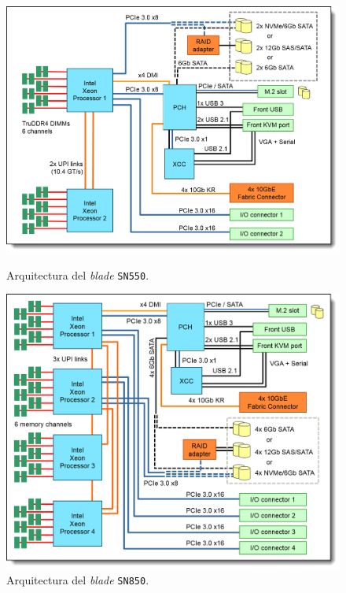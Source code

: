 \documentclass[11pt,a4paper]{article}
\begin{document}
\begin{figure}[H]
\centering
\begin{minipage}{.5\textwidth}
	\centering
	\includegraphics[scale=0.2]{img/sn550-diagrama}
	\caption{Arquitectura del \textit{blade} \texttt{SN550}.}
	\label{fig:sn550}
\end{minipage}%
\begin{minipage}{.5\textwidth}
	\centering
	\includegraphics[scale=0.2]{img/sn850-diagrama}
	\caption{Arquitectura del \textit{blade} \texttt{SN850}.}
	\label{fig:sn850}
\end{minipage}
\end{figure}
\end{document}
